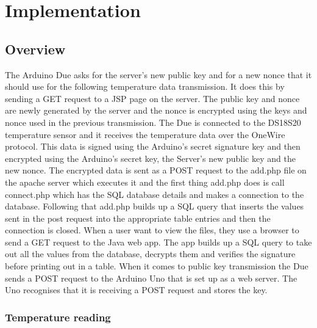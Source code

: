 
\chapter{Implementation}
\label{imple}

\section{Overview}

The Arduino Due asks for the server's new public key and for a new nonce that it should use for the following temperature data transmission. It does this by sending a GET request to a JSP page on the server. The public key and nonce are newly generated by the server and the nonce is encrypted using the keys and nonce used in the previous transmission. The Due is connected to the DS18S20 temperature sensor and it receives the temperature data over the OneWire protocol. This data is signed using the Arduino's secret signature key and then encrypted using the Arduino's secret key, the Server's new public key and the new nonce. The encrypted data is sent as a POST request to the add.php file on the apache server which executes it and the first thing add.php does is call connect.php which has the SQL database details and makes a connection to the database. Following that add.php builds up a SQL query that inserts the values sent in the post request into the appropriate table entries and then the connection is closed.
When a user want to view the files, they use a browser to send a GET request to the Java web app. The app builds up a SQL query to take out all the values from the database, decrypts them and verifies the signature before printing out in a table.
When it comes to public key transmission the Due sends a POST request to the Arduino Uno that is set up as a web server. The Uno recognises that it is receiving a POST request and stores the key.


\subsection{Temperature reading}

